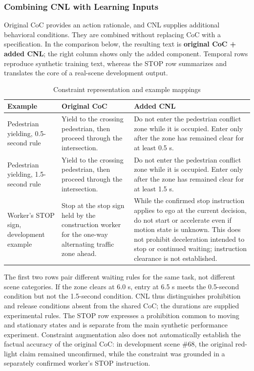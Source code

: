 \documentclass[nolineno]{ieeeaccess}
\begin{document}
\subsubsection{Combining CNL with Learning Inputs}

Original CoC provides an action rationale, and CNL supplies additional behavioral conditions. They are combined without replacing CoC with a specification. In the comparison below, the resulting text is \textbf{original CoC + added CNL}; the right column shows only the added component. Temporal rows reproduce synthetic training text, whereas the STOP row summarizes and translates the core of a real-scene development output.\par

\begin{table}[tp]\caption{Constraint representation and example mappings}
\centering\fontsize{8}{10}\selectfont\setlength{\tabcolsep}{3pt}
\begin{tabular}{@{}>{\raggedright\arraybackslash}p{}>{\raggedright\arraybackslash}p{}>{\raggedright\arraybackslash}p{}@{}}
\toprule
\textbf{Example} & \textbf{Original CoC} & \textbf{Added CNL}\\
\midrule
Pedestrian yielding, 0.5-second rule & Yield to the crossing pedestrian, then proceed through the intersection. & Do not enter the pedestrian conflict zone while it is occupied. Enter only after the zone has remained clear for at least 0.5 s.\\[3pt]
Pedestrian yielding, 1.5-second rule & Yield to the crossing pedestrian, then proceed through the intersection. & Do not enter the pedestrian conflict zone while it is occupied. Enter only after the zone has remained clear for at least 1.5 s.\\[3pt]
Worker's STOP sign, development example & Stop at the stop sign held by the construction worker for the one-way alternating traffic zone ahead. & While the confirmed stop instruction applies to ego at the current decision, do not start or accelerate even if motion state is unknown. This does not prohibit deceleration intended to stop or continued waiting; instruction clearance is not established.\\[3pt]
\bottomrule\end{tabular}
\end{table}

The first two rows pair different waiting rules for the same task, not different scene categories. If the zone clears at 6.0 s, entry at 6.5 s meets the 0.5-second condition but not the 1.5-second condition. CNL thus distinguishes prohibition and release conditions absent from the shared CoC; the durations are supplied experimental rules. The STOP row expresses a prohibition common to moving and stationary states and is separate from the main synthetic performance experiment. Constraint augmentation also does not automatically establish the factual accuracy of the original CoC: in development scene \#68, the original red-light claim remained unconfirmed, while the constraint was grounded in a separately confirmed worker's STOP instruction.\par
\end{document}
